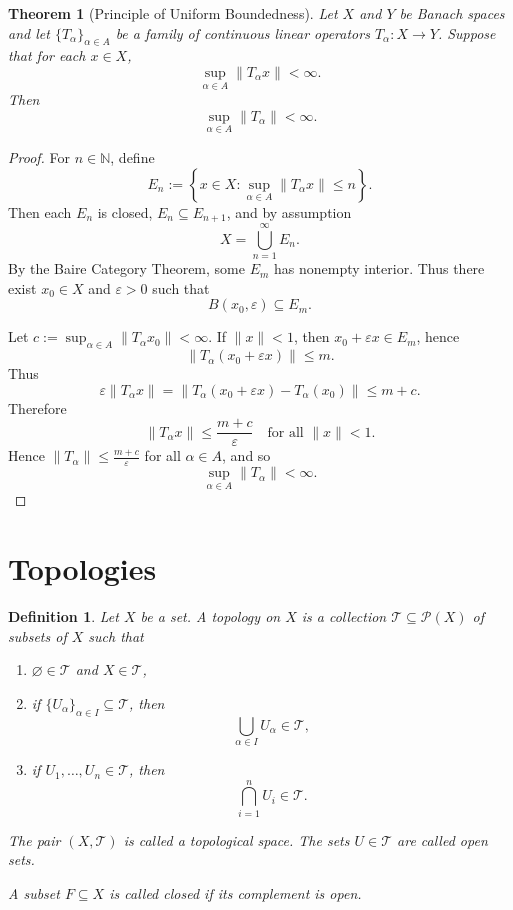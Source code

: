 \documentclass[12pt]{article}
\newtheorem{theorem}{Theorem}
\newtheorem{definition}{Definition}
\begin{document}
\begin{theorem}[Principle of Uniform Boundedness]
Let $X$ and $Y$ be Banach spaces and let $\{T_\alpha\}_{\alpha\in A}$ be a family of continuous linear operators $T_\alpha:X\to Y$. Suppose that for each $x\in X$,
\[
\sup_{\alpha\in A}\|T_\alpha x\| < \infty.
\]
Then
\[
\sup_{\alpha\in A}\|T_\alpha\| < \infty.
\]
\end{theorem}

\begin{proof}
For $n\in\mathbb N$, define
\[
E_n := \left\{ x\in X : \sup_{\alpha\in A}\|T_\alpha x\|\le n \right\}.
\]
Then each $E_n$ is closed, $E_n\subseteq E_{n+1}$, and by assumption
\[
X=\bigcup_{n=1}^\infty E_n.
\]
By the Baire Category Theorem, some $E_m$ has nonempty interior. Thus there exist $x_0\in X$ and $\varepsilon>0$ such that
\[
B(x_0,\varepsilon)\subseteq E_m.
\]

Let $c:=\sup_{\alpha\in A}\|T_\alpha x_0\|<\infty$. If $\|x\|<1$, then $x_0+\varepsilon x\in E_m$, hence
\[
\|T_\alpha(x_0+\varepsilon x)\|\le m.
\]
Thus
\[
\varepsilon\|T_\alpha x\|
=
\|T_\alpha(x_0+\varepsilon x)-T_\alpha(x_0)\|
\le m + c.
\]
Therefore
\[
\|T_\alpha x\|\le \frac{m+c}{\varepsilon}
\quad \text{for all } \|x\|<1.
\]
Hence $\|T_\alpha\|\le \frac{m+c}{\varepsilon}$ for all $\alpha\in A$, and so
\[
\sup_{\alpha\in A}\|T_\alpha\|<\infty.
\]
\end{proof}

\section*{Topologies}

\begin{definition}
Let $X$ be a set. A \emph{topology} on $X$ is a collection $\mathcal{T} \subseteq \mathcal{P}(X)$ of subsets of $X$ such that

\begin{enumerate}[label=(\roman*)]
\item $\varnothing \in \mathcal{T}$ and $X \in \mathcal{T}$,

\item if $\{U_\alpha\}_{\alpha \in I} \subseteq \mathcal{T}$, then
\[
\bigcup_{\alpha \in I} U_\alpha \in \mathcal{T},
\]

\item if $U_1,\dots,U_n \in \mathcal{T}$, then
\[
\bigcap_{i=1}^{n} U_i \in \mathcal{T}.
\]
\end{enumerate}

The pair $(X,\mathcal{T})$ is called a \emph{topological space}. The sets $U \in \mathcal{T}$ are called \emph{open sets}.

A subset $F \subseteq X$ is called \emph{closed} if its complement is open.
\end{definition}
\end{document}
